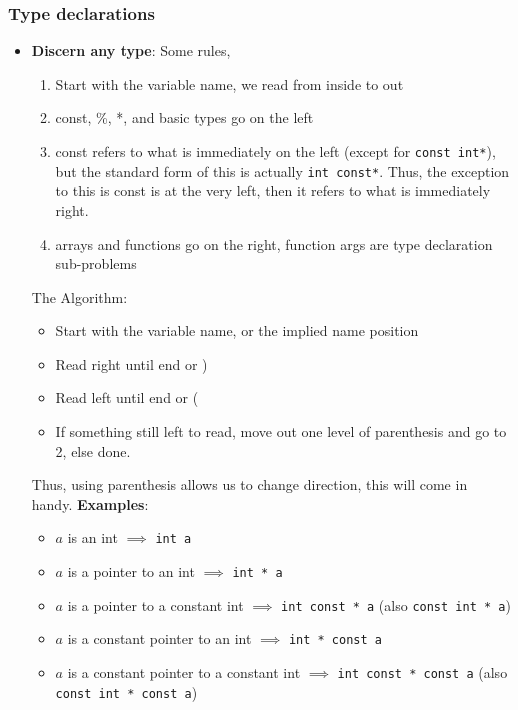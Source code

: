 \documentclass{report}
\begin{document}
    \subsubsection{Type declarations}
    \begin{itemize}
        \item \textbf{Discern any type}: Some rules,
            \begin{enumerate}
                \item Start with the variable name, we read from inside to out
                \item const, \%, *, and basic types go on the left
                \item const refers to what is immediately on the left (except for \texttt{const int*}), but the standard form of this is actually \texttt{int const*}. Thus, the exception to this is const is at the very left, then it refers to what is immediately right.
                \item arrays and functions go on the right, function args are type declaration sub-problems
            \end{enumerate}
            The Algorithm:
            \begin{itemize}
                \item Start with the variable name, or the implied name position 
                \item Read right until end or )
                \item Read left until end or (
                \item If something still left to read, move out one level of parenthesis and go to 2, else done.
            \end{itemize}
            \bigbreak \noindent 
            Thus, using parenthesis allows us to change direction, this will come in handy.
            \bigbreak \noindent 
            \textbf{Examples}:
            \begin{itemize}
                \item  $a$ is an int $\implies$ \texttt{int a}
                \item $a$ is a pointer to an int $\implies$ \texttt{int * a}
                \item $a$ is a pointer to a constant int $\implies$ \texttt{int const * a} (also \texttt{const int * a})
                \item $a$ is a constant pointer to an int $\implies$ \texttt{int * const a}
                \item $a$ is a constant pointer to a constant int $\implies$ \texttt{int const * const a} (also \texttt{const int * const a})

\end{itemize}
\end{itemize}
\end{document}
